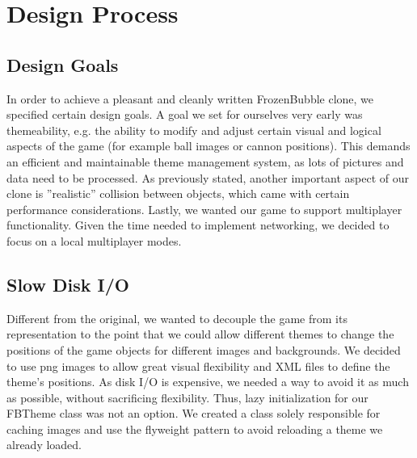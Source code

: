 \section{Design Process}
\subsection{Design Goals}
In order to achieve a pleasant and cleanly written FrozenBubble clone, we specified certain design goals.
A goal we set for ourselves very early was themeability, e.g. the ability to modify and 
adjust certain visual and logical aspects of the game (for example ball images or 
cannon positions). This demands an efficient and maintainable theme management 
system, as lots of pictures and data need to be processed.
As previously stated, another important aspect of our clone is ''realistic'' 
collision between objects, which came with certain performance considerations.
Lastly, we wanted our game to support multiplayer functionality. Given the time 
needed to implement networking, we decided to focus on a local multiplayer modes. 

\subsection{Slow Disk I/O}
%
Different from the original, we wanted to decouple the game from its representation 
to the point that we could allow different themes to change the positions of the 
game objects for different images and backgrounds. We decided to use png images to allow 
great visual flexibility and XML files to define the theme's positions. As disk I/O
is expensive, we needed a way to avoid it as much as possible, without sacrificing 
flexibility. Thus, lazy initialization for our FBTheme class was not an option. 
We created a class solely responsible for caching images and use the flyweight 
pattern to avoid reloading a theme we already loaded.
%
